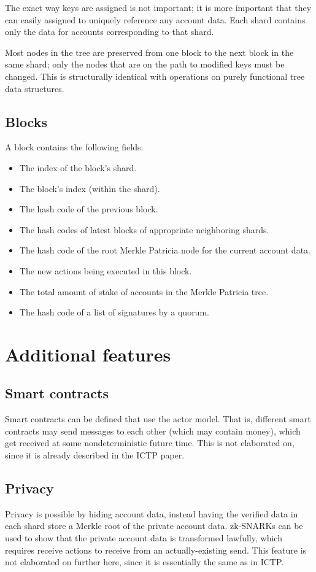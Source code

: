 \documentclass{article}
\begin{document}
The exact way keys are assigned is not important; it is more important that
they can easily assigned to uniquely reference any account data.  Each shard
contains only the data for accounts corresponding to that shard.

Most nodes in the tree are preserved from one block to the next block in the same shard;
only the nodes that are on the path to modified keys must be changed.  This is
structurally identical with operations on purely functional tree data structures.

\subsection{Blocks}

A block contains the following fields:

\begin{itemize}
  \item The index of the block's shard.
  \item The block's index (within the shard).
  \item The hash code of the previous block.
  \item The hash codes of latest blocks of appropriate neighboring shards.
  \item The hash code of the root Merkle Patricia node for the current account data.
  \item The new actions being executed in this block.
  \item The total amount of stake of accounts in the Merkle Patricia tree.
  \item The hash code of a list of signatures by a quorum.
\end{itemize}

\section{Additional features}

  \subsection{Smart contracts}

  Smart contracts can be defined that use the actor model.  That is, different smart contracts may send messages to each other (which may contain money), which get received at some nondeterministic future time.  This is not elaborated on, since it is already described in the ICTP paper.

  \subsection{Privacy}

  Privacy is possible by hiding account data, instead having the verified data in each shard store a Merkle root of the private account data.  zk-SNARKs can be used to show that the private account data is transformed lawfully, which requires receive actions to receive from an actually-existing send.  This feature is not elaborated on further here, since it is essentially the same as in ICTP.
\end{document}
